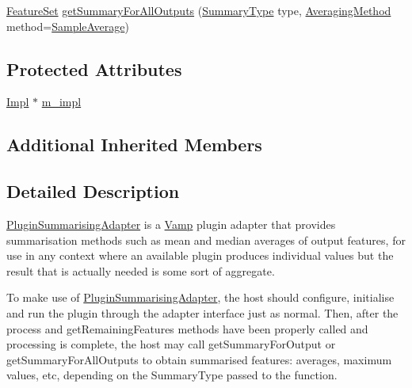 \begin{DoxyCompactItemize}
\item 
\hyperlink{class_vamp_1_1_plugin_a448fb57dc245d47923ec9eeaf9856c5f}{Feature\+Set} \hyperlink{class_vamp_1_1_host_ext_1_1_plugin_summarising_adapter_a5628cd25fe1ce3a469576ba30b3bf4ab}{get\+Summary\+For\+All\+Outputs} (\hyperlink{class_vamp_1_1_host_ext_1_1_plugin_summarising_adapter_af504f810448961fc489e9b6572471705}{Summary\+Type} type, \hyperlink{class_vamp_1_1_host_ext_1_1_plugin_summarising_adapter_a294e9eed9c541dcedbaa4f2dfda1ac76}{Averaging\+Method} method=\hyperlink{class_vamp_1_1_host_ext_1_1_plugin_summarising_adapter_a294e9eed9c541dcedbaa4f2dfda1ac76ae8833d866dec593d29f1f4e3cd1e6e36}{Sample\+Average})
\end{DoxyCompactItemize}
\subsection*{Protected Attributes}
\begin{DoxyCompactItemize}
\item 
\hyperlink{class_vamp_1_1_host_ext_1_1_plugin_summarising_adapter_1_1_impl}{Impl} $\ast$ \hyperlink{class_vamp_1_1_host_ext_1_1_plugin_summarising_adapter_af131140817d9f131650af98b6b8d7a94}{m\+\_\+impl}
\end{DoxyCompactItemize}
\subsection*{Additional Inherited Members}


\subsection{Detailed Description}
\hyperlink{class_vamp_1_1_host_ext_1_1_plugin_summarising_adapter}{Plugin\+Summarising\+Adapter} is a \hyperlink{namespace_vamp}{Vamp} plugin adapter that provides summarisation methods such as mean and median averages of output features, for use in any context where an available plugin produces individual values but the result that is actually needed is some sort of aggregate.

To make use of \hyperlink{class_vamp_1_1_host_ext_1_1_plugin_summarising_adapter}{Plugin\+Summarising\+Adapter}, the host should configure, initialise and run the plugin through the adapter interface just as normal. Then, after the process and get\+Remaining\+Features methods have been properly called and processing is complete, the host may call get\+Summary\+For\+Output or get\+Summary\+For\+All\+Outputs to obtain summarised features\+: averages, maximum values, etc, depending on the Summary\+Type passed to the function.

